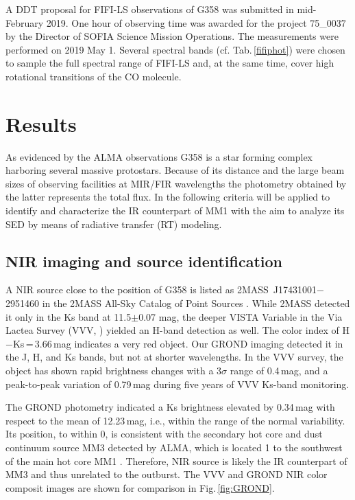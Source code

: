 \documentclass[longauth,usenatbib]{aa}
\begin{document}
A DDT proposal for FIFI-LS observations of G358 was submitted in mid-February 2019.
One hour of observing time was awarded for the project 75\_0037 by the Director of SOFIA Science Mission Operations. The measurements were performed on 2019 May 1. Several spectral bands (cf. Tab.\,\ref{fifiphot}) were chosen to sample the full spectral range of FIFI-LS and, at the same time, cover high rotational transitions of the CO molecule.

\section{Results}\label{res}

As evidenced by the ALMA observations G358 is a star forming complex harboring several massive protostars. Because of its distance and the large beam sizes of observing facilities at MIR/FIR wavelengths the photometry obtained by the latter represents the total flux. In the following criteria will be applied to identify and characterize the IR counterpart of MM1 with the aim to analyze its SED by means of radiative transfer (RT) modeling.

\subsection{NIR imaging and source identification}\label{rnir}
A NIR source close to the position of G358 is listed as 2MASS~J17431001$-$2951460 in the 2MASS All-Sky Catalog of Point Sources . While 2MASS detected it only in the Ks band at 11.5$\pm$0.07 mag, the deeper VISTA Variable in the Via Lactea Survey (VVV, ) yielded an H-band detection as well. The color index of H$-$Ks\,=\,3.66\,mag indicates a very red object. Our GROND imaging detected it in the J, H, and Ks bands, but not at shorter wavelengths. In the VVV survey, the object has shown rapid brightness changes with a 3$\sigma$ range of 0.4\,mag, and a peak-to-peak variation of 0.79\,mag during five years of VVV Ks-band monitoring. 

The GROND photometry indicated a Ks brightness elevated by 0.34\,mag with respect to the mean of 12.23\,mag, i.e., within the range of the normal variability. Its position, to within 0, is consistent with the secondary hot core and dust continuum source MM3 detected by ALMA, which is located 1 to the southwest of the main hot core MM1 . Therefore, NIR source is likely the IR counterpart of MM3 and thus unrelated to the outburst. The VVV and GROND NIR color composit images are shown for comparison in Fig.\,\ref{fig:GROND}.
\end{document}
